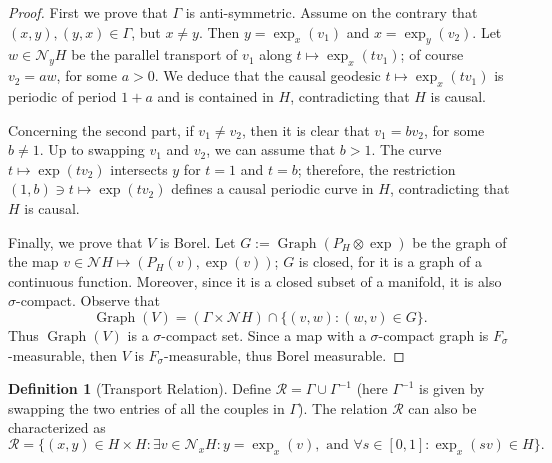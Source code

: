 \documentclass[12pt,a4paper]{amsart}
\theoremstyle{plain}
\theoremstyle{definition}
\newtheorem{definition}[lemma]{Definition}
\numberwithin{equation}{section}
\DeclareMathOperator{\Graph}{Graph}
\newcommand{\relation}{\mathcal{R}}
\newcommand{\normal}{\mathscr{N}}
\begin{document}
\begin{proof}
First we prove that $\Gamma$ is anti-symmetric. 
Assume on the contrary that $(x,y),(y,x)\in \Gamma$, but 
$x\neq y$.
Then $y=\exp_x (v_1)$ and $x=\exp_y (v_2)$.
%
Let $w\in\normal_y H$ be the parallel transport of $v_1$ along
$t\mapsto \exp_x(tv_1)$; of course $v_2=a w$, for some $a>0$.
%
We deduce that
the causal geodesic $t\mapsto\exp_x (tv_1)$  is periodic of period $1+a$ and is contained in $H$, contradicting that $H$ is causal.

Concerning the second part, if $v_1\neq v_2$, then it is clear that $v_1=b v_2$, for some
$b\neq 1$. Up to swapping $v_1$ and $v_2$, we can assume that $b>1$.  The curve $t\mapsto\exp (t v_2)$ intersects
$y$ for $t=1$ and $t=b$; therefore, the restriction $(1, b)\ni t\mapsto \exp (t v_2)$ defines a causal periodic curve in $H$, contradicting  that $H$ is causal.

Finally, we prove that $V$ is Borel.
%
Let $G:=\Graph(P_H\otimes \exp)$ be the graph of the map $v\in\normal
H\mapsto (P_{H}(v),\exp (v))$; $G$ is closed, for it is a graph of a continuous function.
%
Moreover, since it is a closed subset of a manifold, it is also
$\sigma$-compact.
%
Observe that
$$
\Graph(V)= \left(\Gamma\times\normal H \right) \cap \{(v,w):(w,v)\in G\}.
$$
Thus $\Graph(V)$ is a $\sigma$-compact set.
%
Since a map with a $\sigma$-compact graph is $F_\sigma$-measurable,
then $V$ is $F_\sigma$-measurable, thus Borel measurable.
\end{proof}


\begin{definition}[Transport Relation]
Define $\relation=\Gamma\cup\Gamma^{-1}$ (here $\Gamma^{-1}$ is given
by swapping the two entries of all the couples in $\Gamma$).
%
The relation $\relation$ can also be
characterized as
%
\begin{equation}
  \label{eq:defn-relation}
  \relation=
  \{
  (x,y)\in H\times H:
  \exists v\in\normal_xH
  :
  y=\exp_x(v),
  \text{ and }
  \forall s\in[0,1] :\exp_x(sv)\in H 
  \}.
\end{equation}
\end{definition}
\end{document}

